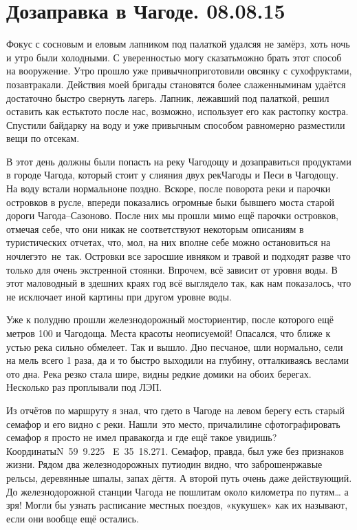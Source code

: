 \chapter{Дозаправка в Чагоде. 08.08.15}

Фокус с сосновым и еловым лапником под палаткой удался\mdash я не замёрз, хоть ночь и утро были холодными. С уверенностью могу сказать\mdash можно брать этот способ на вооружение. Утро прошло уже привычно\mdash приготовили овсянку с сухофруктами, позавтракали. Действия моей бригады становятся более слаженными\mdash нам удаётся достаточно быстро свернуть лагерь. Лапник, лежавший под палаткой, решил оставить как есть\mdash кто\sdash то после нас, возможно, использует его как растопку костра. Спустили байдарку на воду и уже привычным  способом равномерно разместили вещи по отсекам. 

В этот день должны были попасть на реку Чагодощу и дозаправиться продуктами в городе Чагода, который стоит у слияния двух рек\mdash Чагоды и Песи в Чагодощу. На воду встали нормально\mdash не поздно. Вскоре, после поворота реки и парочки островков в русле, впереди показались огромные быки бывшего моста старой дороги Чагода\nobreakdash--Сазоново. После них мы прошли мимо ещё парочки островков, отмечая себе, что они никак не соответствуют некоторым описаниям в туристических отчетах, что, мол, на них вполне себе можно остановиться на ночлег\mdash это~не~так. Островки все заросшие ивняком и травой и подходят разве что только для очень экстренной стоянки. Впрочем, всё зависит от уровня воды. В этот маловодный в здешних краях год всё выглядело так, как нам показалось, что не исключает иной картины при другом уровне воды. 

Уже к полудню прошли железнодорожный мост\mdash ориентир, после которого ещё метров 100 и Чагодоща. Места красоты неописуемой! Опасался, что ближе к устью река сильно обмелеет. Так и вышло. Дно песчаное, шли нормально, сели на мель всего 1 раза, да и то быстро выходили на глубину, отталкиваясь веслами ото дна. Река резко стала шире, видны редкие домики на обоих берегах. Несколько раз проплывали под ЛЭП. 

Из отчётов по маршруту я знал, что где\sdash то в Чагоде на левом берегу есть старый семафор и его видно с реки. Нашли~это место, причалили\mdash не сфотографировать семафор я просто не имел права\mdash когда и где ещё такое увидишь? Координаты\mdash N~59\degree~9.225\textprime~ E~35\degree~18.271\textprime. Семафор, правда, был уже без признаков жизни. Рядом два железнодорожных пути\mdash один видно, что заброшен\mdash ржавые рельсы, деревянные шпалы, запах дёгтя. А второй путь очень даже действующий. До железнодорожной станции Чагода не пошли\mdash там около километра по путям… а зря! Могли бы узнать расписание местных поездов, «кукушек» как их называют, если они вообще ещё остались. 

